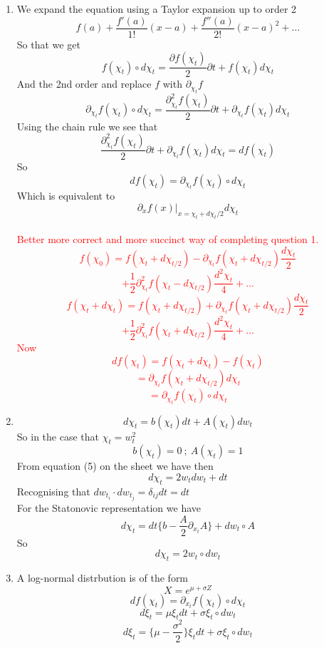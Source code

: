 \documentclass[10pt,a4paper,oneside]{article}
\begin{document}
    \begin{enumerate}
        \item We expand the equation using a Taylor expansion up to order 2 
        $$ f(a) + \frac{f'(a)}{1!} (x-a) + \frac{f''(a)}{2!}(x-a)^2 + \ldots $$
        So that we get 
        $$ f(\chi_t ) \circ d \chi_t = \frac{\partial f(\chi_t)}{2} \partial t + f(\chi_t) d \chi_t $$
        And the 2nd order and replace $f$ with $\partial_{\chi_t} f$ 
        $$ \partial_{\chi_t} f(\chi_t) \circ d \chi_t = \frac{\partial_{\chi_t}^2 f(\chi_t)}{2} \partial t + \partial_{\chi_t} f(\chi_t) d \chi_t $$
        Using the chain rule we see that 
        $$ \frac{\partial_{\chi_t}^2 f(\chi_t)}{2} \partial t + \partial_{\chi_t} f(\chi_t) d\chi_t = d f(\chi_t) $$
        So 
        $$ d f(\chi_t) = \partial_{\chi_t} f(\chi_t) \circ d \chi_t $$
        Which is equivalent to 
        $$ \partial_x f(x) |_{x= \chi_t + d\chi_t /2 } d\chi_t $$
        \\
        \textcolor{red}{
            Better more correct and more succinct way of completing question 1.
            $$ f(\chi_0) = f(\chi_t + d \chi_{t/2}) - \partial_{\chi_{t}} f(\chi_t + d \chi_{t/2}) \frac{d \chi_t}{2} $$
            $$  + \frac{1}{2} \partial_{\chi_{t}}^2 f(\chi_t - d \chi_{t/2}) \frac{d^2 \chi_t}{4} + \ldots$$
            $$ f(\chi_t + d \chi_t ) = f(\chi_t + d \chi_{t/2}) + \partial_{\chi_t} f(\chi_t + d \chi_{t/2})\frac{d \chi_t}{2} $$
            $$ + \frac{1}{2} \partial_{\chi_t}^2 f(\chi_t + d \chi_{t/2}) \frac{d^2 \chi_t}{4} + \ldots $$ 
            Now 
            $$ d f(\chi_t) = f(\chi_t + d \chi_t) - f(\chi_t) $$
            $$ = \partial_{\chi_t} f(\chi_t + d \chi_{t/2}) d \chi_t $$
            $$ = \partial_{\chi_t} f(\chi_t) \circ d \chi_t $$
        }

        \item $$ d \chi_t = b(\chi_t) dt + A(\chi_t) dw_t $$
        So in the case that $\chi_t = w_t^2 $ 
        $$ b(\chi_t) = 0 \ ; \ A(\chi_t) =1 $$
        From equation (5) on the sheet we have then
        $$ d \chi_t = 2 w_t dw_t + dt $$
        Recognising that $dw_{t_i} \cdot dw_{t_j} = \delta_{ij} dt = dt $ 
        \\
        For the Statonovic representation we have 
        $$d \chi_t = dt \{b - \frac{A}{2} \partial_{x_t}A \}+ dw_t \circ A $$
        So 
        $$ d \chi_t = 2 w_t \circ dw_t $$

        \item A log-normal distrbution is of the form 
        $$ X = e^{\mu + \sigma Z} $$
        $$d f(\chi_t) = \partial_{x_t} f(\chi_t ) \circ d \chi_t $$
        $$ d \xi_t = \mu \xi_t dt + \sigma \xi_t \circ dw_t  $$
        $$ d \xi_t = \Big\{ \mu - \frac{\sigma^2}{2}\Big\} \xi_t dt + \sigma \xi_t \circ dw_t$$


\end{enumerate}
\end{document}

